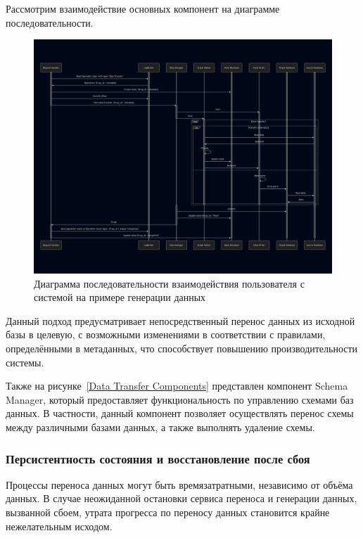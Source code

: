 Рассмотрим взаимодействие основных компонент на диаграмме последовательности.

\begin{figure}
  \includegraphics[scale=0.2]{./img/mermaid-sequence-DataTransfer.png}
  \caption{Диаграмма последовательности взаимодействия пользователя с системой на примере генерации данных}
  \label{Sequence DataTransferComponents}
\end{figure}

Данный подход предусматривает непосредственный перенос данных из исходной базы в целевую, с возможными изменениями в соответствии с правилами, определёнными в метаданных, что способствует повышению производительности системы.

Также на рисунке~\ref{Data Transfer Components} представлен компонент Schema Manager, который предоставляет функциональность по управлению схемами баз данных. В частности, данный компонент позволяет осуществлять перенос схемы между различными базами данных, а также выполнять удаление схемы.

\subsubsection{Персистентность состояния и восстановление после сбоя}

Процессы переноса данных могут быть времязатратными, независимо от объёма данных. В случае неожиданной остановки сервиса переноса и генерации данных, вызванной сбоем, утрата прогресса по переносу данных становится крайне нежелательным исходом.

